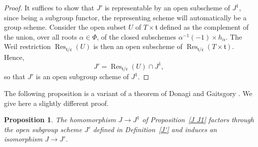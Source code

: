 \documentclass[12pt,english]{smfart}
\numberwithin{equation}{subsection}
\newtheorem{proposition}[equation]{Proposition}
\theoremstyle{remark}
\begin{document}
\begin{proof}
It suffices to show that $J'$ is representable by an open subscheme of $J^1$, since being a subgroup functor, the representing scheme will automatically be a group scheme. Consider the open subset $U$ of $T\times\mathfrak{t}$ defined as the complement of the union, over all roots $\alpha\in\Phi$, of the closed subschemes $\alpha^{-1}(-1)\times h_\alpha$. The Weil restriction $\operatorname{Res}_{\mathfrak{t}/\mathfrak{c}}(U)$ is then an open subscheme of $\operatorname{Res}_{\mathfrak{t}/\mathfrak{c}}(T\times\mathfrak{t})$. Hence,
$$
J' = \operatorname{Res}_{\mathfrak{t}/\mathfrak{c}}(U) \cap J^1,
$$
so that $J'$ is an open subgroup scheme of $J^1$.
\end{proof}

The following proposition is a variant of a theorem of Donagi and Gaitsgory \cite[Theorem 11.6]{DG}. We give here a slightly different proof.

\begin{proposition}\label{J=J'}
The homomorphism $J\to J^1$ of Proposition~\ref{J J1} factors through the open subgroup scheme $J'$ defined in Definition~\ref{J'} and induces an isomorphism $J\to J'$.
\end{proposition}
\end{document}
